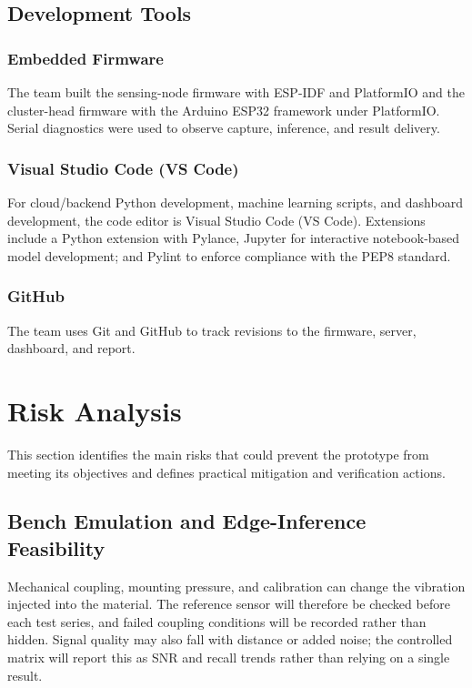 \documentclass[12pt,a4paper,oneside]{memoir}
\newcommand{\earlierrevision}[1]{#1}
\newcommand{\newrevision}[1]{#1}
\begin{document}
\subsection{Development Tools}
\label{sec:dev_tools}

\subsubsection{\newrevision{Embedded Firmware}}

\newrevision{The team built the sensing-node firmware with ESP-IDF and PlatformIO and the cluster-head firmware with the Arduino ESP32 framework under PlatformIO. Serial diagnostics were used to observe capture, inference, and result delivery.}

\subsubsection{Visual Studio Code (VS Code)}

\newrevision{For cloud/backend Python development, machine learning scripts, and dashboard development,} the code editor is Visual Studio Code (VS Code). Extensions include a Python extension with Pylance, Jupyter for interactive notebook-based model development; and Pylint to enforce compliance with the PEP8 standard.

\subsubsection{GitHub}

\newrevision{The team uses Git and GitHub to track revisions to the firmware, server, dashboard, and report.}

\section{Risk Analysis}
\label{sec:RiskAnalysis}

\earlierrevision{This section identifies the main risks that could prevent the prototype from meeting its objectives and defines practical mitigation and verification actions.}

\subsection{\newrevision{Bench Emulation and Edge-Inference Feasibility}}

\newrevision{Mechanical coupling, mounting pressure, and calibration can change the vibration injected into the material. The reference sensor will therefore be checked before each test series, and failed coupling conditions will be recorded rather than hidden. Signal quality may also fall with distance or added noise; the controlled matrix will report this as SNR and recall trends rather than relying on a single result.}
\end{document}
